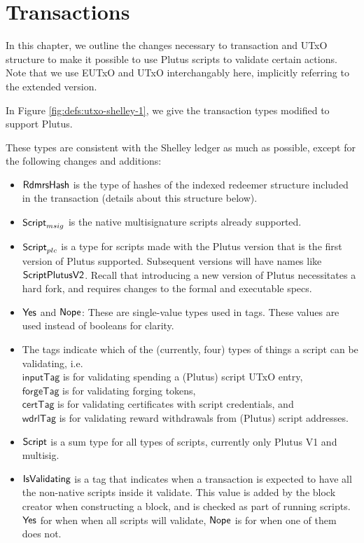 \section{Transactions}
\label{sec:transactions}

In this chapter, we outline the changes necessary to transaction and
UTxO structure to make it possible to use Plutus scripts to validate
certain actions. Note that we use EUTxO and UTxO interchangably here,
implicitly referring to the extended version.

In Figure \ref{fig:defs:utxo-shelley-1}, we give the transaction types modified
to support Plutus.

These types are consistent with the Shelley ledger
as much as possible,
except for the following changes and additions:

\begin{itemize}
  \item $\mathsf{RdmrsHash}$ is the type of hashes of the indexed redeemer structure
  included in the transaction (details about this structure below).

  \item  $\mathsf{Script}_{msig}$ is the native multisignature scripts already supported.

  \item $\mathsf{Script}_{plc}$ is a type for scripts made with the Plutus version
  that is the first version of Plutus supported. Subsequent versions will
  have names like $\mathsf{ScriptPlutusV2}$. Recall that introducing
  a new version of Plutus necessitates a hard fork, and requires changes
  to the formal and executable specs.

  \item $\mathsf{Yes}$ and $\mathsf{Nope}$: These are single-value types used in tags. These
  values are used instead of booleans for clarity.

  \item The tags indicate which of the (currently, four) types of things a script
  can be validating, i.e. \\
  $\mathsf{inputTag}$ is for validating spending a (Plutus) script UTxO entry, \\
  $\mathsf{forgeTag}$ is for validating forging tokens, \\
  $\mathsf{certTag}$  is for validating certificates with script credentials, and  \\
  $\mathsf{wdrlTag}$ is for validating reward withdrawals from (Plutus) script addresses.

  \item $\mathsf{Script}$ is a sum type for all types of scripts, currently only
  Plutus V1 and multisig.
  \item $\mathsf{IsValidating}$ is a tag that indicates when a transaction is
  expected to have all the non-native scripts inside it validate.
  This value is added by the block creator when
  constructing a block, and is checked as part of running scripts.
  $\mathsf{Yes}$ for when when all scripts will validate,
  $\mathsf{Nope}$ is for when one of them does not.


\end{itemize}

